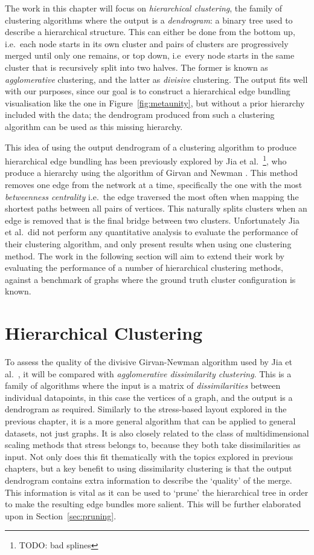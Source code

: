 The work in this chapter will focus on \emph{hierarchical clustering}, the family of clustering algorithms where the output is a \textit{dendrogram}: a binary tree used to describe a hierarchical structure.
This can either be done from the bottom up, i.e.\ each node starts in its own cluster and pairs of clusters are progressively merged until only one remains, or top down, i.e\ every node starts in the same cluster that is recursively split into two halves. The former is known as \emph{agglomerative} clustering, and the latter as \emph{divisive} clustering.
The output fits well with our purposes, since our goal is to construct a hierarchical edge bundling visualisation like the one in Figure~\ref{fig:metaunity}, but without a prior hierarchy included with the data; the dendrogram produced from such a clustering algorithm can be used as this missing hierarchy.

This idea of using the output dendrogram of a clustering algorithm to produce hierarchical edge bundling has been previously explored by Jia et al.~\cite{Jia2011}\footnote{TODO: bad splines}, who produce a hierarchy using the algorithm of Girvan and Newman \cite{Newman2004}. This method removes one edge from the network at a time, specifically the one with the most \emph{betweenness centrality} i.e.\ the edge traversed the most often when mapping the shortest paths between all pairs of vertices. This naturally splits clusters when an edge is removed that is the final bridge between two clusters.
Unfortunately Jia et al.\ did not perform any quantitative analysis to evaluate the performance of their clustering algorithm, and only present results when using one clustering method. The work in the following section will aim to extend their work by evaluating the performance of a number of hierarchical clustering methods, against a benchmark of graphs where the ground truth cluster configuration is known.

\section{Hierarchical Clustering}
\label{sec:hierarchicalclustering}
To assess the quality of the divisive Girvan-Newman algorithm used by Jia et al.~\cite{Jia2011}, it will be compared with \emph{agglomerative dissimilarity clustering}.
This is a family of algorithms where the input is a matrix of \emph{dissimilarities} between individual datapoints, in this case the vertices of a graph, and the output is a dendrogram as required. Similarly to the stress-based layout explored in the previous chapter, it is a more general algorithm that can be applied to general datasets, not just graphs. It is also closely related to the class of multidimensional scaling methods that stress belongs to, because they both take dissimilarities as input.
Not only does this fit thematically with the topics explored in previous chapters, but a key benefit to using dissimilarity clustering is that the output dendrogram contains extra information to describe the `quality' of the merge. This information is vital as it can be used to `prune' the hierarchical tree in order to make the resulting edge bundles more salient. This will be further elaborated upon in Section~\ref{sec:pruning}.

